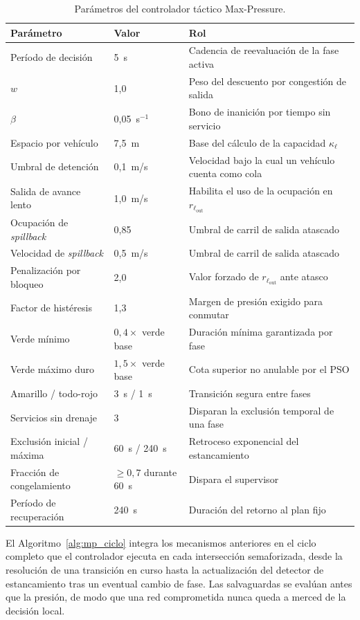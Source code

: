 \begin{table}[htbp]
\centering
\caption{Parámetros del controlador táctico Max-Pressure.}
\label{tab:mp_parametros}
\footnotesize
\begin{tabular}{lll}
\toprule
\textbf{Parámetro} & \textbf{Valor} & \textbf{Rol} \\
\midrule
Período de decisión & 5~s & Cadencia de reevaluación de la fase activa \\
$w$ & 1,0 & Peso del descuento por congestión de salida \\
$\beta$ & 0,05~s$^{-1}$ & Bono de inanición por tiempo sin servicio \\
Espacio por vehículo & 7,5~m & Base del cálculo de la capacidad $\kappa_{\ell}$ \\
Umbral de detención & 0,1~m/s & Velocidad bajo la cual un vehículo cuenta como cola \\
Salida de avance lento & 1,0~m/s & Habilita el uso de la ocupación en $r_{\ell_\text{out}}$ \\
\midrule
Ocupación de \emph{spillback} & 0,85 & Umbral de carril de salida atascado \\
Velocidad de \emph{spillback} & 0,5~m/s & Umbral de carril de salida atascado \\
Penalización por bloqueo & 2,0 & Valor forzado de $r_{\ell_\text{out}}$ ante atasco \\
\midrule
Factor de histéresis & 1,3 & Margen de presión exigido para conmutar \\
Verde mínimo & $0{,}4 \times$ verde base & Duración mínima garantizada por fase \\
Verde máximo duro & $1{,}5 \times$ verde base & Cota superior no anulable por el PSO \\
Amarillo / todo-rojo & 3~s / 1~s & Transición segura entre fases \\
\midrule
Servicios sin drenaje & 3 & Disparan la exclusión temporal de una fase \\
Exclusión inicial / máxima & 60~s / 240~s & Retroceso exponencial del estancamiento \\
Fracción de congelamiento & $\geq 0{,}7$ durante 60~s & Dispara el supervisor \\
Período de recuperación & 240~s & Duración del retorno al plan fijo \\
\bottomrule
\end{tabular}
\end{table}

El Algoritmo~\ref{alg:mp_ciclo} integra los mecanismos anteriores en el ciclo completo que el controlador ejecuta en cada intersección semaforizada, desde la resolución de una transición en curso hasta la actualización del detector de estancamiento tras un eventual cambio de fase. Las salvaguardas se evalúan antes que la presión, de modo que una red comprometida nunca queda a merced de la decisión local.

